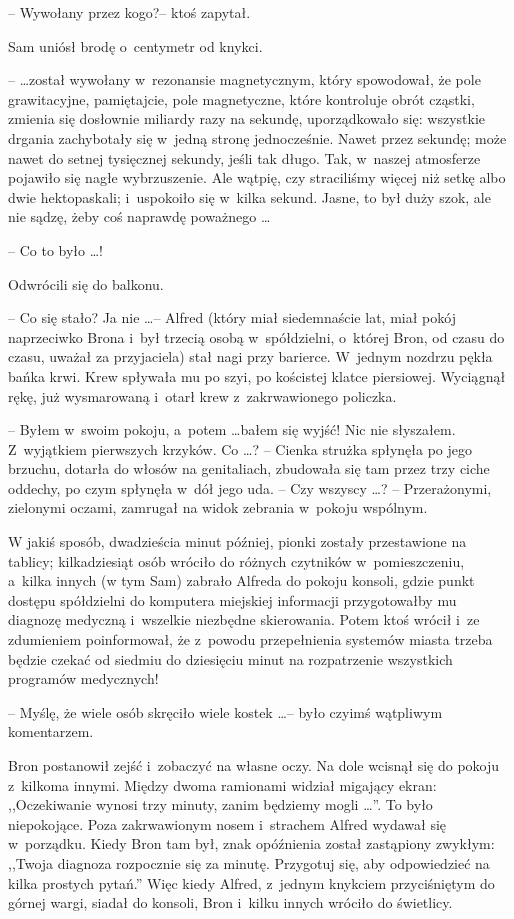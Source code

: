 \documentclass[oneside,polish,11pt,rmheadings]{mwbk}
\begin{document}
-- Wywołany przez kogo?-- ktoś zapytał. 

Sam uniósł brodę o~centymetr od knykci.  

--  \ldots został wywołany w~rezonansie magnetycznym, który spowodował, że pole grawitacyjne, pamiętajcie, pole magnetyczne, które kontroluje obrót cząstki, zmienia się dosłownie miliardy razy na sekundę, uporządkowało się: wszystkie drgania zachybotały się w~jedną stronę jednocześnie. Nawet przez sekundę; może nawet do setnej tysięcznej sekundy, jeśli tak długo. Tak, w~naszej atmosferze pojawiło się nagłe wybrzuszenie. Ale wątpię, czy straciliśmy więcej niż setkę albo dwie hektopaskali; i~uspokoiło się w~kilka sekund. Jasne, to był duży szok, ale nie sądzę, żeby coś naprawdę poważnego \ldots  

-- Co to było  \ldots ! 

Odwrócili się do balkonu. 

-- Co się stało? Ja nie \ldots  -- Alfred (który miał siedemnaście lat, miał pokój naprzeciwko Brona i~był trzecią osobą w~spółdzielni, o~której Bron, od czasu do czasu, uważał za przyjaciela) stał nagi przy barierce. W~jednym nozdrzu pękła bańka krwi. Krew spływała mu po szyi, po kościstej klatce piersiowej. Wyciągnął rękę, już wysmarowaną i~otarł krew z~zakrwawionego policzka.  

-- Byłem w~swoim pokoju, a~potem \ldots   bałem się wyjść! Nic nie słyszałem. Z~wyjątkiem pierwszych krzyków. Co  \ldots  ? -- Cienka strużka spłynęła po jego brzuchu, dotarła do włosów na genitaliach, zbudowała się tam przez trzy ciche oddechy, po czym spłynęła w~dół jego uda. -- Czy wszyscy \ldots ? -- Przerażonymi, zielonymi oczami, zamrugał na widok zebrania w~pokoju wspólnym. 

W jakiś sposób, dwadzieścia minut później, pionki zostały przestawione na tablicy; kilkadziesiąt osób wróciło do różnych czytników w~pomieszczeniu, a~kilka innych (w tym Sam) zabrało Alfreda do pokoju konsoli, gdzie punkt dostępu spółdzielni do komputera miejskiej informacji przygotowałby mu diagnozę medyczną i~wszelkie niezbędne skierowania. Potem ktoś wrócił i~ze zdumieniem poinformował, że z~powodu przepełnienia systemów miasta trzeba będzie czekać od siedmiu do dziesięciu minut na rozpatrzenie wszystkich programów medycznych!  

-- Myślę, że wiele osób skręciło wiele kostek \ldots -- było czyimś wątpliwym komentarzem.

  Bron postanowił zejść i~zobaczyć na własne oczy. Na dole wcisnął się do pokoju z~kilkoma innymi. Między dwoma ramionami widział migający ekran: ,,Oczekiwanie wynosi trzy minuty, zanim będziemy mogli \ldots ''. To było niepokojące. Poza zakrwawionym nosem i~strachem Alfred wydawał się w~porządku. Kiedy Bron tam był, znak opóźnienia został zastąpiony zwykłym: ,,Twoja diagnoza rozpocznie się za minutę. Przygotuj się, aby odpowiedzieć na kilka prostych pytań.'' Więc kiedy Alfred, z~jednym knykciem przyciśniętym do górnej wargi, siadał do konsoli, Bron i~kilku innych wróciło do świetlicy. 
\end{document}
